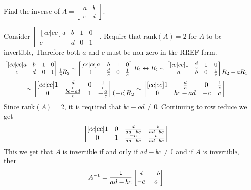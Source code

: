 \documentclass[english, 12pt]{article}
\begin{document}
\begin{exmp}
Find the inverse of $A = \begin{bmatrix} a & b \\ c & d \end{bmatrix}$.

\begin{sol}
Consider $\begin{bmatrix}[cc|cc] a & b & 1 & 0 \\ c & d & 0 & 1 \end{bmatrix}$.\n
Require that $\text{rank}(A) = 2$ for $A$ to be invertible, Therefore both $a$ and $c$ must be non-zero in the RREF form.
\[\begin{bmatrix}[cc|cc] a & b & 1 & 0 \\ c & d & 0 & 1 \end{bmatrix} \begin{matrix} \\ \frac{1}{c} R_2 \end{matrix} \sim \begin{bmatrix}[cc|cc] a & b & 1 & 0 \\ 1 & \frac{d}{c} & 0 & \frac{1}{c} \end{bmatrix}\begin{matrix} R_1 \leftrightarrow R_2 \\ \end{matrix} \sim \begin{bmatrix}[cc|cc] 1 & \frac{d}{c} & 1 & 0 \\ a & b & 0 & \frac{1}{c} \end{bmatrix} \begin{matrix} \\ R_2 - aR_1 \end{matrix} \]
\[\sim \begin{bmatrix}[cc|cc] 1 & \frac{d}{c} & 0 & \frac{1}{c} \\ 0 & \frac{bc-ad}{c} & 1 & -\frac{a}{c} \end{bmatrix} \begin{matrix} \\ (-c) R_2 \end{matrix}\sim \begin{bmatrix}[cc|cc] 1 & \frac{d}{c} & 0 & \frac{1}{c} \\ 0 & bc-ad & -c & a \end{bmatrix}\]
Since $\text{rank}(A) = 2 $, it is required that $bc - ad \neq 0$. Continuing to row reduce we get
\[\begin{bmatrix}[cc|cc] 1 & 0 & \frac{d}{ad-bc} & \frac{-b}{ad-bc} \\ 0 & 1 & \frac{-c}{ad-bc} & \frac{a}{ad-bc} \end{bmatrix}\]
This we get that $A$ is invertible if and only if $ad - bc \neq 0$ and if $A$ is invertible, then
\[A^{-1} = \frac{1}{ad-bc} \begin{bmatrix} d & -b \\ -c & a \end{bmatrix}\]
\end{sol}
\end{exmp}
\end{document}
